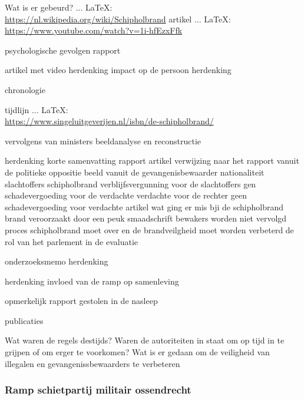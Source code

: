 Wat is er gebeurd?
 ... \LaTeX:\\ \url{https://nl.wikipedia.org/wiki/Schipholbrand}
\cite{}
artikel
 ... \LaTeX:\\ \url{https://www.youtube.com/watch?v=1i-hfEzxFfk}

psychologische gevolgen
rapport

\cite{onderzoeksraad2610schipholoost}
artikel met video
herdenking
impact op de persoon
herdenking

\cite{schipholbrandvideoargos}
chronologie

\cite{nunl30052023feitenoverzicht}
tijdlijn
 ... \LaTeX:\\ \url{https://www.singeluitgeverijen.nl/isbn/de-schipholbrand/}

vervolgens van ministers
beeldanalyse en reconstructie

\cite{eenvandaagschipholbrand}
herdenking
korte samenvatting
rapport
artikel
verwijzing naar het rapport vanuit de politieke oppositie
beeld vanuit de gevangenisbewaarder
nationaliteit slachtoffers schipholbrand
verblijfsvergunning voor de slachtoffers
gen schadevergoeding voor de verdachte
verdachte voor de rechter
geen schadevergoeding voor verdachte
artikel wat ging er mis bji de schipholbrand
brand veroorzaakt door een peuk
smaadschrift
bewakers worden niet vervolgd
proces schipholbrand moet over en de brandveilgheid moet worden verbeterd
de rol van het parlement in de evaluatie

\cite{parlementairemonitorschipholbrand}
onderzoeksmemo
herdenking

herdenking
invloed van de ramp op samenleving

\cite{videonpoNOVA13112008}
opmerkelijk rapport gestolen in de nasleep

\cite{rizoomes01052014schipholbrand}


publicaties

\cite{heuvelkroesschipholbrandcamerabeelden}
Wat waren de regels destijds?
Waren de autoriteiten in staat om op tijd in te grijpen of om erger te voorkomen?
Wat is er gedaan om de veiligheid van illegalen en gevangenissbewaarders te verbeteren

\subsubsection{Ramp schietpartij militair ossendrecht }


